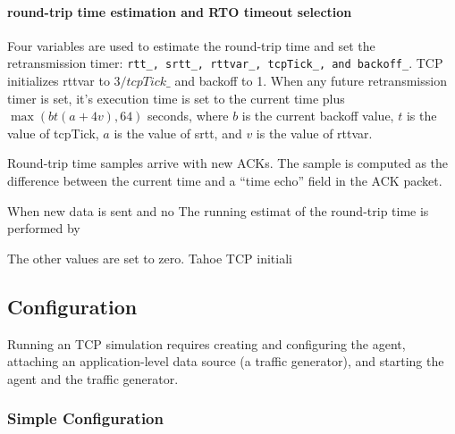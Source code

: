 \documentclass{article}
\begin{document}
\paragraph{round-trip time estimation and RTO timeout selection}
Four variables are used to estimate the round-trip time and
set the retransmission timer: {\tt rtt\_, srtt\_, rttvar\_, tcpTick\_,
and backoff\_}.
TCP initializes rttvar to $3/tcpTick\_$ and backoff to 1.
When any future retransmission timer is set, it's execution
time is set to the current time plus $\max(bt(a+4v), 64)$ seconds,
where $b$ is the current backoff value, $t$ is the value of tcpTick,
$a$ is the value of srtt, and $v$ is the value of rttvar.

Round-trip time samples arrive with new ACKs.
The sample is computed as the difference between the current
time and a ``time echo'' field in the ACK packet.


When new data is sent and no 
The running estimat of the round-trip time is performed by


The other values are set to zero.
Tahoe TCP initiali

\subsection{Configuration}
\label{sec:tcp-config}

Running an TCP simulation requires
creating and configuring the agent,
attaching an application-level data source (a traffic generator), and
starting the agent and the traffic generator.

\subsubsection{Simple Configuration}
\end{document}

